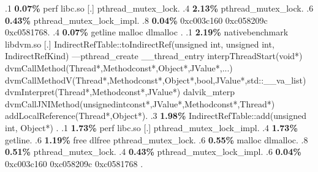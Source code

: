 \begin{profile}
{.1 \textbf{ 0.07\%} perf             libc.so                [.] pthread\_mutex\_lock. 
.4 \textbf{2.13\%} pthread\_mutex\_lock. 
.6 \textbf{0.43\%} pthread\_mutex\_lock\_impl. 
.8 \textbf{0.04\%} 0xc003c160\newline {} 0xc058209c\newline {} 0xc0581768. 
.4 \textbf{0.07\%} getline\newline {} malloc\newline {} dlmalloc\newline {} . 
.1 \textbf{ 2.19\%} nativebenchmark  libdvm.so              [.] IndirectRefTable::toIndirectRef(unsigned int, unsigned int, IndirectRefKind)\newline {} ---pthread\_create\newline {} \_\_thread\_entry\newline {} interpThreadStart(void*)\newline {} dvmCallMethod(Thread*,Methodconst*,Object*,JValue*,...)\newline {} dvmCallMethodV(Thread*,Methodconst*,Object*,bool,JValue*,std::\_\_va\_list)\newline {} dvmInterpret(Thread*,Methodconst*,JValue*)\newline {} dalvik\_mterp\newline {} dvmCallJNIMethod(unsignedintconst*,JValue*,Methodconst*,Thread*)\newline {} addLocalReference(Thread*,Object*). 
.3 \textbf{1.98\%} IndirectRefTable::add(unsigned int, Object*)\newline {} . 
.1 \textbf{ 1.73\%} perf             libc.so                [.] pthread\_mutex\_lock\_impl. 
.4 \textbf{1.73\%} getline. 
.6 \textbf{1.19\%} free\newline {} dlfree\newline {} pthread\_mutex\_lock. 
.6 \textbf{0.55\%} malloc\newline {} dlmalloc. 
.8 \textbf{0.51\%} pthread\_mutex\_lock. 
.4 \textbf{0.43\%} pthread\_mutex\_lock\_impl. 
.6 \textbf{0.04\%} 0xc003c160\newline {} 0xc058209c\newline {} 0xc0581768\newline {} . 
}
\end{profile}
